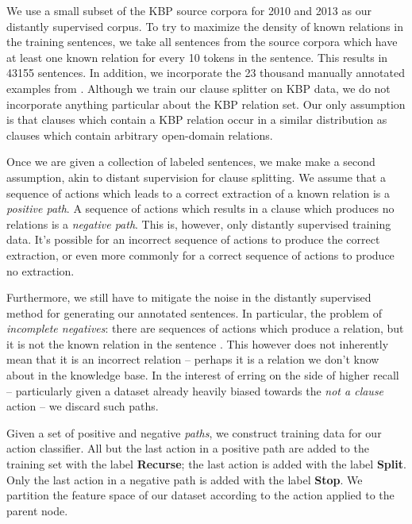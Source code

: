 We use a small subset of the KBP source corpora for 
  2010 \cite{key:2010ji-kbpoverview}
  and 2013 \cite{key:2013surdeanu-kbpoverview}
  as our distantly supervised corpus.
To try to maximize the density of known relations in the training sentences,
  we take all sentences from the source corpora which have at least one known
  relation for every 10 tokens in the sentence.
This results in \num{43155} sentences.
In addition, we incorporate the 23 thousand manually annotated examples
  from .
Although we train our clause splitter on KBP data, we do not incorporate
  anything particular about the KBP relation set.
Our only assumption is that clauses which contain a KBP relation occur in
  a similar distribution as clauses which contain arbitrary open-domain
  relations.

Once we are given a collection of labeled sentences, we make make a second
  assumption, akin to distant supervision for clause splitting.
We assume that a sequence of actions which leads to a correct extraction of
  a known relation is a \textit{positive path}.
A sequence of actions which results in a clause which produces no relations
  is a \textit{negative path}.
This is, however, only distantly supervised training data.
It's possible for an incorrect sequence of actions to produce the correct
  extraction, or even more commonly for a correct sequence of actions to 
  produce no extraction.

Furthermore, we still have to mitigate the noise in the distantly supervised
  method for generating our annotated sentences.
In particular, the problem of \textit{incomplete negatives}: there are sequences
  of actions which produce a relation, but it is not the known relation in the
  sentence \cite{key:2013min-incomplete}.
This however does not inherently mean that it is an incorrect relation -- perhaps
  it is a relation we don't know about in the knowledge base.
In the interest of erring on the side of higher recall -- particularly given
  a dataset already heavily biased towards the \textit{not a clause} action --
  we discard such paths.

Given a set of positive and negative \textit{paths}, we construct training
  data for our action classifier.
All but the last action in a positive path are added to the training set
  with the label \textbf{Recurse}; the last action is added with the label
  \textbf{Split}.
Only the last action in a negative path is added with the label \textbf{Stop}.
We partition the feature space of our dataset according to the action
  applied to the parent node.

